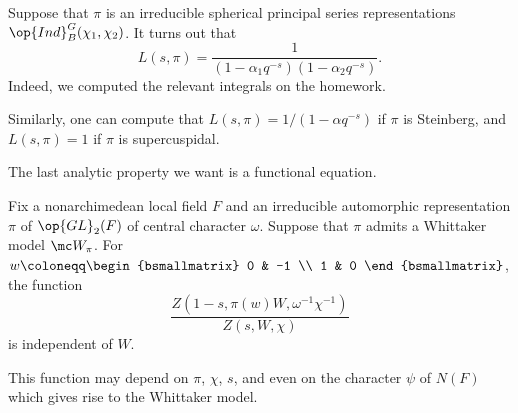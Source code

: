 \documentclass[../notes.tex]{subfiles}
\begin{document}
\begin{example}
	Suppose that $\pi$ is an irreducible spherical principal series representations $\op{Ind}_B^G(\chi_1,\chi_2)$. It turns out that
	\[L(s,\pi)=\frac1{\left(1-\alpha_1q^{-s}\right)\left(1-\alpha_2q^{-s}\right)}.\]
	Indeed, we computed the relevant integrals on the homework.
\end{example}
\begin{example}
	Similarly, one can compute that $L(s,\pi)=1/\left(1-\alpha q^{-s}\right)$ if $\pi$ is Steinberg, and $L(s,\pi)=1$ if $\pi$ is supercuspidal.
\end{example}
The last analytic property we want is a functional equation.
\begin{theorem}
	Fix a nonarchimedean local field $F$ and an irreducible automorphic representation $\pi$ of $\op{GL}_2(F)$ of central character $\omega$. Suppose that $\pi$ admits a Whittaker model $\mc W_\pi$. For $w\coloneqq\begin{bsmallmatrix}
		0 & -1 \\ 1 & 0
	\end{bsmallmatrix}$, the function
	\[\frac{Z\left(1-s,\pi(w)W,\omega^{-1}\chi^{-1}\right)}{Z(s,W,\chi)}\]
	is independent of $W$.
\end{theorem}
\begin{remark}
	This function may depend on $\pi$, $\chi$, $s$, and even on the character $\psi$ of $N(F)$ which gives rise to the Whittaker model.
\end{remark}
\end{document}
